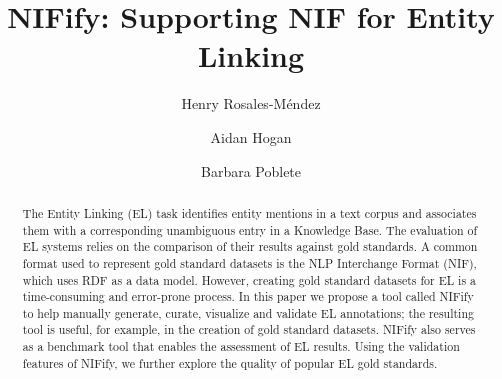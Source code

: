 \documentclass[sigconf]{acmart}
\begin{document}
%
\title{NIFify: Supporting NIF for Entity Linking}

%
\author{Henry Rosales-M\'endez}

\author{Aidan Hogan}


\author{Barbara Poblete}




%
\renewcommand{\shortauthors}{Rosales-M\'endez et al.}

%
\begin{abstract}
The Entity Linking (EL) task identifies entity mentions in a text corpus and associates them with a corresponding unambiguous entry in a Knowledge Base. The evaluation of EL systems relies on the comparison of their results against gold standards. A common format used to represent gold standard datasets is the NLP Interchange Format (NIF), which uses RDF as a data model. However, creating gold standard datasets for EL is a time-consuming and error-prone process. In this paper we propose a tool called NIFify to help manually generate, curate, visualize and validate EL annotations; the resulting tool is useful, for example, in the creation of gold standard datasets. NIFify also serves as a benchmark tool that enables the assessment of EL results. Using the validation features of NIFify, we further explore the quality of popular EL gold standards. 
\end{abstract}
\end{document}
